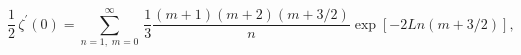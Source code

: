 \begin{equation}
\frac{1}{2}\,\zeta^{\prime}(0)=\sum_{n=1,\;m=0}^\infty
\,\frac{1}{3}\frac{(m+1)(m+2)(m+3/2)}{n}
\exp[-2Ln(m+3/2)],
\end{equation}

